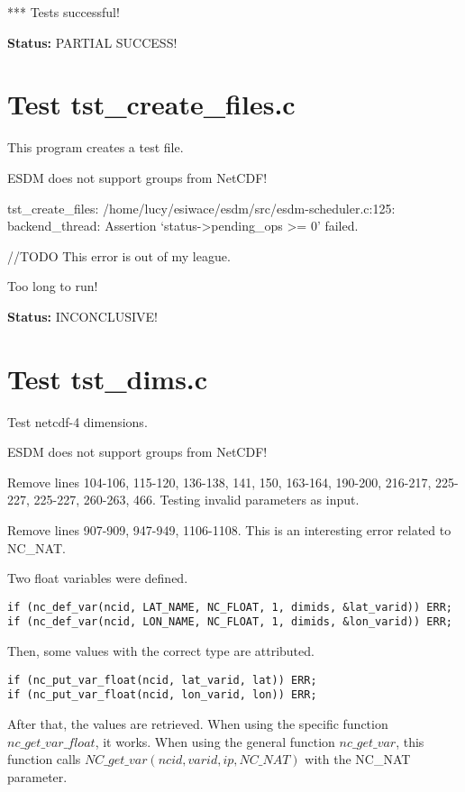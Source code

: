 *** Tests successful!

{\bf \large Status: } PARTIAL SUCCESS!

\section{Test tst\_create\_files.c}

This program creates a test file.

ESDM does not support groups from NetCDF!

tst\_create\_files: /home/lucy/esiwace/esdm/src/esdm-scheduler.c:125: backend\_thread: Assertion `status->pending\_ops >= 0' failed.

//TODO This error is out of my league.

Too long to run!

{\bf \large Status: } INCONCLUSIVE!

\section{Test tst\_dims.c}

Test netcdf-4 dimensions.

ESDM does not support groups from NetCDF!

Remove lines 104-106, 115-120, 136-138, 141, 150, 163-164, 190-200, 216-217, 225-227, 225-227, 260-263, 466. Testing invalid parameters as input.

Remove lines 907-909, 947-949, 1106-1108. This is an interesting error related to NC\_NAT.

Two float variables were defined.

\begin{verbatim}
if (nc_def_var(ncid, LAT_NAME, NC_FLOAT, 1, dimids, &lat_varid)) ERR;
if (nc_def_var(ncid, LON_NAME, NC_FLOAT, 1, dimids, &lon_varid)) ERR;
\end{verbatim}

Then, some values with the correct type are attributed.

\begin{verbatim}
if (nc_put_var_float(ncid, lat_varid, lat)) ERR;
if (nc_put_var_float(ncid, lon_varid, lon)) ERR;
\end{verbatim}

After that, the values are retrieved. When using the specific function $nc\_get\_var\_float$, it works. When using the general function $nc\_get\_var$, this function calls $NC\_get\_var(ncid, varid, ip, NC\_NAT)$ with the NC\_NAT parameter.

